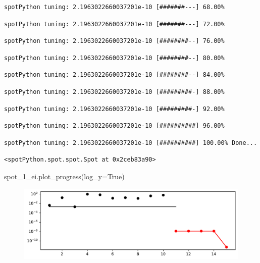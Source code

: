 \documentclass[
  letterpaper,
  DIV=11,
  numbers=noendperiod]{scrreprt}
\newenvironment{Shaded}{\begin{snugshade}}{\end{snugshade}}
\newcommand{\NormalTok}[1]{\textcolor[rgb]{0.00,0.23,0.31}{#1}}
\newcommand{\OperatorTok}[1]{\textcolor[rgb]{0.37,0.37,0.37}{#1}}
\newcommand{\VariableTok}[1]{\textcolor[rgb]{0.07,0.07,0.07}{#1}}
\begin{document}
\begin{verbatim}
spotPython tuning: 2.1963022660037201e-10 [#######---] 68.00% 
\end{verbatim}

\begin{verbatim}
spotPython tuning: 2.1963022660037201e-10 [#######---] 72.00% 
\end{verbatim}

\begin{verbatim}
spotPython tuning: 2.1963022660037201e-10 [########--] 76.00% 
\end{verbatim}

\begin{verbatim}
spotPython tuning: 2.1963022660037201e-10 [########--] 80.00% 
\end{verbatim}

\begin{verbatim}
spotPython tuning: 2.1963022660037201e-10 [########--] 84.00% 
\end{verbatim}

\begin{verbatim}
spotPython tuning: 2.1963022660037201e-10 [#########-] 88.00% 
\end{verbatim}

\begin{verbatim}
spotPython tuning: 2.1963022660037201e-10 [#########-] 92.00% 
\end{verbatim}

\begin{verbatim}
spotPython tuning: 2.1963022660037201e-10 [##########] 96.00% 
\end{verbatim}

\begin{verbatim}
spotPython tuning: 2.1963022660037201e-10 [##########] 100.00% Done...
\end{verbatim}

\begin{verbatim}
<spotPython.spot.spot.Spot at 0x2ceb83a90>
\end{verbatim}

\begin{Shaded}
\begin{Highlighting}[]
\NormalTok{spot\_1\_ei.plot\_progress(log\_y}\OperatorTok{=}\VariableTok{True}\NormalTok{)}
\end{Highlighting}
\end{Shaded}

\begin{figure}[H]

{\centering \includegraphics{012_num_spot_ei_files/figure-pdf/cell-11-output-1.pdf}

}

\end{figure}
\end{document}
